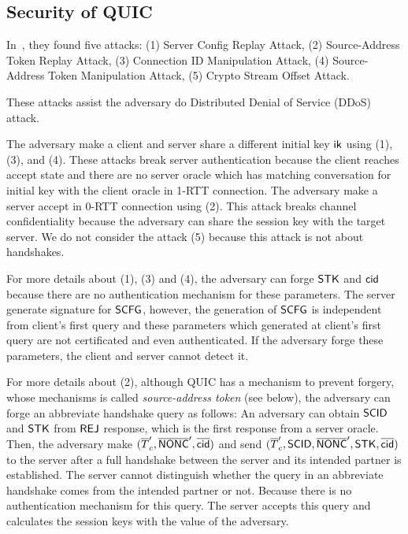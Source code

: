 \subsection{Security of QUIC} \label{sec:quic_detail}

In~\cite{LJBN15:QUIC}, they found five attacks:
(1) Server Config Replay Attack,
(2) Source-Address Token Replay Attack,
(3) Connection ID Manipulation Attack,
(4) Source-Address Token Manipulation Attack,
(5) Crypto Stream Offset Attack.

These attacks assist the adversary do Distributed Denial of Service
(DDoS) attack.

The adversary make a client and server share a different
initial key $\mathsf{ik}$ using (1), (3), and (4).
These attacks break server authentication because the client
reaches accept state and there are no server oracle which has
matching conversation for initial key with the client oracle in 1-RTT connection.
The adversary make a server accept in 0-RTT connection
using (2).
This attack breaks channel confidentiality because the adversary
can share the session key with the target server.
We do not consider the attack (5) because this attack is not
about handshakes.

For more details about (1), (3) and (4), the adversary can forge
$\mathsf{STK}$ and $\mathsf{cid}$ because there are no authentication mechanism
for these parameters.
The server generate signature for $\mathsf{SCFG}$, however, the generation
of $\mathsf{SCFG}$ is independent from client's first query and these parameters
which generated at client's first query
are not certificated and even authenticated.
If the adversary forge these parameters, the client and server cannot
detect it.

For more details about (2), although QUIC has a mechanism to prevent forgery,
whose mechanisms is called \textit{source-address token}
(see below), the adversary can forge an abbreviate handshake
query as follows: An adversary can obtain $\mathsf{SCID}$ and $\mathsf{STK}$ from $\mathsf{REJ}$
response, which is the first response from a server oracle.
Then, the adversary make $(\overline{T}_c^{\prime},
\overline{\mathsf{NONC}}^{\prime}, \overline{\mathsf{cid}})$ and send $(\overline{T}_c^{\prime},
\mathsf{SCID}, \overline{\mathsf{NONC}}^{\prime}, \mathsf{STK}, \overline{\mathsf{cid}})$ to the server after a
full handshake between the server and its intended partner
is established.
The server cannot distinguish whether the query in an abbreviate handshake
comes from the intended partner or not. Because there is no
authentication mechanism for this query. The server accepts
this query and calculates the session keys with the value
of the adversary.

